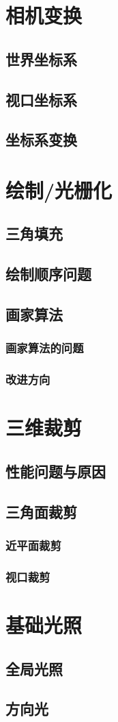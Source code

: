 \documentclass[12pt,oneside,a4paper]{ctexart}
\begin{document}
\section{相机变换}
\subsection{世界坐标系}
\subsection{视口坐标系}
\subsection{坐标系变换}
\section{绘制/光栅化}
\subsection{三角填充}
\subsection{绘制顺序问题}
\subsection{画家算法}
\subsubsection{画家算法的问题}
\subsubsection{改进方向}
\section{三维裁剪}
\subsection{性能问题与原因}
\subsection{三角面裁剪}
\subsubsection{近平面裁剪}
\subsubsection{视口裁剪}
\section{基础光照}
\subsection{全局光照}
\subsection{方向光}
\end{document}
